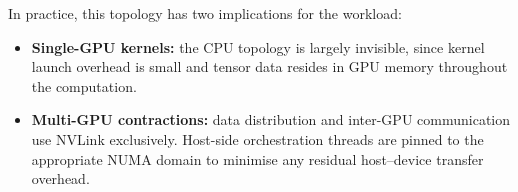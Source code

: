 In practice, this topology has two implications for the workload:

\begin{itemize}
  \item \textbf{Single-GPU kernels:} the CPU topology is largely invisible, since kernel launch overhead is small and tensor data resides in GPU memory throughout the computation.
  \item \textbf{Multi-GPU contractions:} data distribution and inter-GPU communication use NVLink exclusively. Host-side orchestration threads are pinned to the appropriate NUMA domain to minimise any residual host--device transfer overhead.
\end{itemize}
